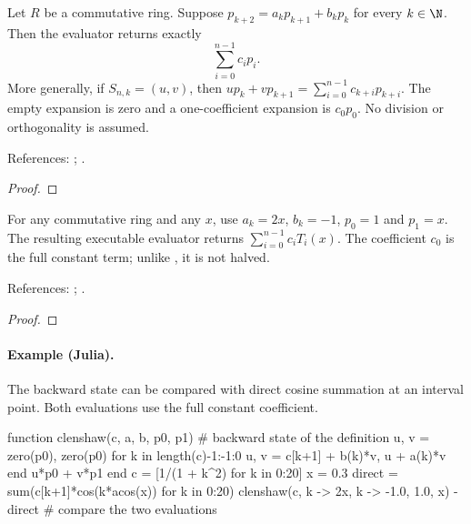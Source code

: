 \begin{theorem}
\label{thm:clenshaw}
\leanok
Let $R$ be a commutative ring. Suppose $p_{k+2}=a_kp_{k+1}+b_kp_k$
for every $k\in\N$.
Then the evaluator returns exactly
\[
 \sum_{i=0}^{n-1}c_i p_i.
\]
More generally, if $S_{n,k}=(u,v)$, then
$u p_k+v p_{k+1}=\sum_{i=0}^{n-1}c_{k+i}p_{k+i}$.
The empty expansion is zero and a one-coefficient expansion is $c_0p_0$.
No division or orthogonality is assumed.

References: \cite{clenshaw}; \cite[18.40(i)]{dlmf}.
\end{theorem}
\begin{proof}
\leanok
\end{proof}


\begin{theorem}
\label{thm:chebyshev-clenshaw}
\leanok
For any commutative ring and any $x$, use $a_k=2x$, $b_k=-1$,
$p_0=1$ and $p_1=x$. The resulting executable evaluator returns
$\sum_{i=0}^{n-1}c_iT_i(x)$.
The coefficient $c_0$ is the full constant term; unlike \cite[3.11(ii)]{dlmf},
it is not halved.

References: \cite{clenshaw}; \cite[3.11(ii)]{dlmf}.
\end{theorem}
\begin{proof}
\leanok
\end{proof}

\paragraph{Example (Julia).} The backward state can be compared with direct cosine summation at an interval point. Both evaluations use the full constant coefficient.

\begin{juliacode}
function clenshaw(c, a, b, p0, p1)  # backward state of the definition
    u, v = zero(p0), zero(p0)
    for k in length(c)-1:-1:0
        u, v = c[k+1] + b(k)*v, u + a(k)*v
    end
    u*p0 + v*p1
end
c = [1/(1 + k^2) for k in 0:20]
x = 0.3
direct = sum(c[k+1]*cos(k*acos(x)) for k in 0:20)
clenshaw(c, k -> 2x, k -> -1.0, 1.0, x) - direct   # compare the two evaluations
\end{juliacode}

